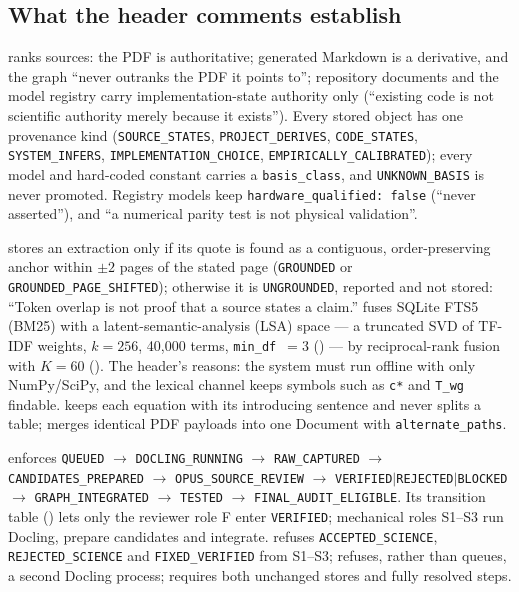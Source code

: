 \subsection{What the header comments establish}
 ranks sources: the PDF is authoritative; generated Markdown is a derivative, and the graph ``never outranks the PDF it points to''; repository documents and the model registry carry implementation-state authority only (``existing code is not scientific authority merely because it exists''). Every stored object has one provenance kind (\texttt{SOURCE\_STATES}, \texttt{PROJECT\_DERIVES}, \texttt{CODE\_STATES}, \texttt{SYSTEM\_INFERS}, \texttt{IMPLEMENTATION\_CHOICE}, \texttt{EMPIRICALLY\_CALIBRATED}); every model and hard-coded constant carries a \texttt{basis\_class}, and \texttt{UNKNOWN\_BASIS} is never promoted. Registry models keep \texttt{hardware\_qualified: false} (``never asserted''), and ``a numerical parity test is not physical validation''.

 stores an extraction only if its quote is found as a contiguous, order-preserving anchor within $\pm2$ pages of the stated page (\texttt{GROUNDED} or \texttt{GROUNDED\_PAGE\_SHIFTED}); otherwise it is \texttt{UNGROUNDED}, reported and not stored: ``Token overlap is not proof that a source states a claim.''  fuses SQLite FTS5 (BM25) with a latent-semantic-analysis (LSA) space --- a truncated SVD of TF-IDF weights, $k=256$, 40{,}000 terms, \texttt{min\_df}~$=3$ () --- by reciprocal-rank fusion with $K=60$ (). The header's reasons: the system must run offline with only NumPy/SciPy, and the lexical channel keeps symbols such as \texttt{c*} and \texttt{T\_wg} findable.  keeps each equation with its introducing sentence and never splits a table;  merges identical PDF payloads into one Document with \texttt{alternate\_paths}.

 enforces \texttt{QUEUED} $\rightarrow$ \texttt{DOCLING\_RUNNING} $\rightarrow$ \texttt{RAW\_CAPTURED} $\rightarrow$ \texttt{CANDIDATES\_PREPARED} $\rightarrow$ \texttt{OPUS\_SOURCE\_REVIEW} $\rightarrow$ \texttt{VERIFIED}$\mid$\texttt{REJECTED}$\mid$\texttt{BLOCKED} $\rightarrow$ \texttt{GRAPH\_INTEGRATED} $\rightarrow$ \texttt{TESTED} $\rightarrow$ \texttt{FINAL\_AUDIT\_ELIGIBLE}. Its transition table () lets only the reviewer role F enter \texttt{VERIFIED}; mechanical roles S1--S3 run Docling, prepare candidates and integrate.  refuses \texttt{ACCEPTED\_SCIENCE}, \texttt{REJECTED\_SCIENCE} and \texttt{FIXED\_VERIFIED} from S1--S3;  refuses, rather than queues, a second Docling process;  requires both unchanged stores and fully resolved steps.

